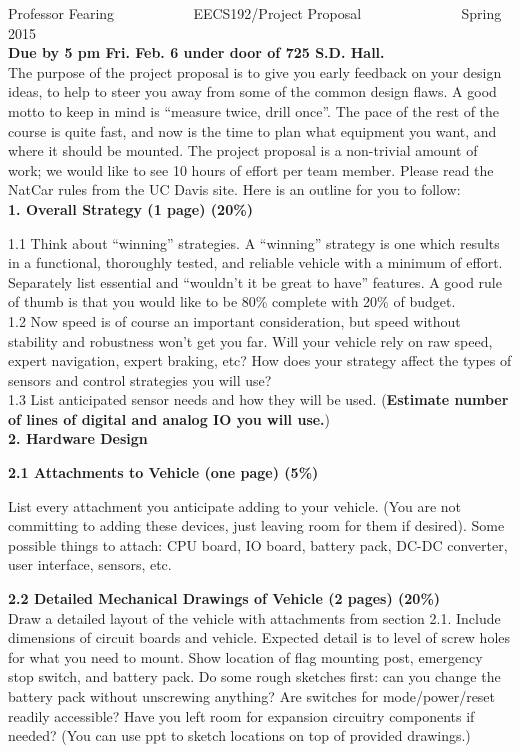\documentclass[10pt]{article}
\begin{document}
\thispagestyle{empty}
Professor Fearing ~~~~~~~~~~ EECS192/Project Proposal ~~~~~~~~~~~~~ Spring 2015\\
{\bf Due by 5 pm Fri. Feb. 6 under door of 725 S.D. Hall.} \\


The purpose of the project proposal is to give you early feedback on
your design ideas, to help to steer you away from some of the common
design flaws. A good motto to keep in mind is
``measure twice, drill once''. The pace of the rest of the course is
quite fast, and now is the time to plan what equipment you want, and
where it should be mounted. 
The project proposal is a non-trivial amount of work; we
would like to see 10 hours of effort per team member. Please
read the NatCar rules from the UC Davis site.
Here is an outline for you to follow:\\

{\bf 1. Overall Strategy (1 page) (20\%)}

1.1
Think about ``winning''
strategies. A ``winning'' strategy is one which results in
a functional, thoroughly tested, and reliable vehicle with a minimum
of effort. Separately list essential and 
``wouldn't it be great to have'' features. A good rule of thumb
is that you would like to be 80\% complete with 20\% of budget.\\

1.2
Now speed is of course an important consideration,
but speed without stability and robustness won't get you far.
Will your vehicle rely on raw speed, expert navigation,
expert braking, etc?  How does your strategy affect the types of sensors and
control strategies you will use?  \\

1.3
List anticipated sensor needs and
how they will be used. ({\bf Estimate number of lines of digital and analog
IO you will use.})\\

{\bf 2. Hardware Design }

{\bf 2.1 Attachments to Vehicle (one page) (5\%)}

List every attachment you anticipate adding to your vehicle. (You are
not committing to adding these devices, just leaving room for them if
desired). Some possible things to attach: CPU board, IO board, 
battery pack, DC-DC converter, user interface, sensors,
etc.

{\bf 2.2 Detailed Mechanical Drawings of Vehicle (2 pages) (20\%)}\\
Draw a detailed layout of the
vehicle with attachments from section 2.1. Include dimensions of
circuit boards and vehicle. Expected detail is to level of screw
holes for what you need to mount. 
Show location of flag mounting post, emergency stop switch,
and battery pack.
Do some rough sketches first: can you change the battery pack
without unscrewing anything? 
Are
switches for mode/power/reset readily accessible? Have you left room
for expansion circuitry components if needed?
(You can use ppt to sketch locations on top of provided drawings.)
\end{document}

